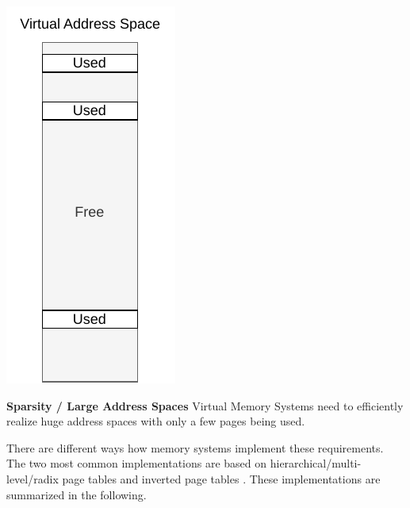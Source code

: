 \begin{marginfigure}
    \centering
    \includegraphics*[width=0.5\marginparwidth]{figures/fund_sparsity.pdf}
    \caption{\textbf{Sparsity / Large Address Spaces} Virtual Memory Systems need to efficiently
        realize huge address spaces with only a few pages being used.}
\end{marginfigure}


There are different ways how memory systems implement these requirements.
The two most common implementations are based on hierarchical/multi-level/radix
\cite{jacob1998virtualissues,yaniv2016hash,tanenbaumOS} page tables and inverted page tables \cite{jacob1998look,jacob1998virtualissues}.
These implementations are summarized in the following.





